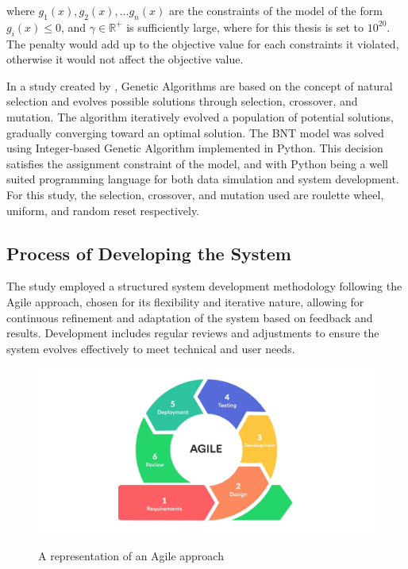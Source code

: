 \documentclass[11pt,letterpaper,]{article}
\begin{document}
	where $g_1(x),g_2(x),...g_n(x)$ are the constraints of the model of the form $g_i(x)\le0$, and $\gamma\in\mathbb{R}^+$ is sufficiently large, where for this thesis is set to $10^{20}$. The penalty would add up to the objective value for each constraints it violated, otherwise it would not affect the objective value.	
	
	In a study created by \textcite{Mathew2012}, Genetic Algorithms are based on the concept of natural selection and evolves possible solutions through selection, crossover, and mutation. The algorithm iteratively evolved a population of potential solutions, gradually converging toward an optimal solution. The BNT model was solved using Integer-based Genetic Algorithm implemented in Python. This decision satisfies the assignment constraint of the model, and with Python being a well suited programming language for both data simulation and system development. For this study, the selection, crossover, and mutation used are roulette wheel, uniform, and random reset respectively.
	
	\subsection{Process of Developing the System}
	
	The study employed a structured system development methodology following the Agile approach, chosen for its flexibility and iterative nature, allowing for continuous refinement and adaptation of the system based on feedback and results. Development includes regular reviews and adjustments to ensure the system evolves effectively to meet technical and user needs. 
	
	\begin{figure}[h!]
		\caption{A representation of an Agile approach}
		\centering
		\includegraphics[width=0.9\columnwidth]{AGILE}
		\label{Agile}
	\end{figure}
	
\end{document}
